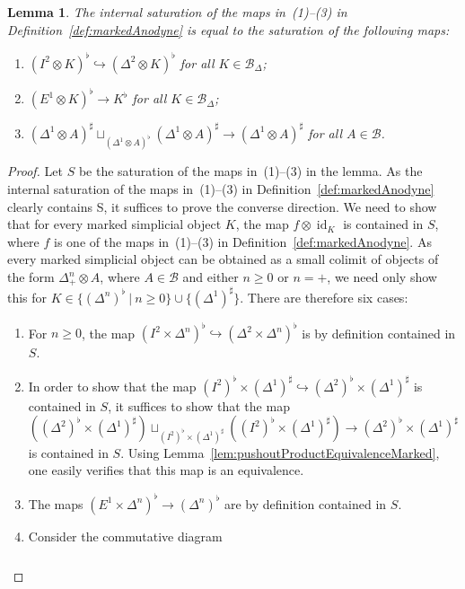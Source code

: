 \documentclass[reqno]{amsart}
\numberwithin{equation}{subsection}
\theoremstyle{plain}
\newtheorem{lemma}[equation]{Lemma}
\theoremstyle{definition}
\let\scr=\mathcal
\let\into=\hookrightarrow
\def\BB{\scr B}
\DeclareMathOperator{\id}{id}
\newcommand{\Simp}[1]{#1_{\Delta}}
\begin{document}
\begin{lemma}
	\label{lem:markedAnodyneGenerators1}
	The internal saturation of the maps in~(1)--(3) in Definition~\ref{def:markedAnodyne} is equal to the saturation of the following maps:
	\begin{enumerate}
	\item $(I^2\otimes K)^\flat\into(\Delta^2\otimes K)^\flat$ for all $K\in\Simp\BB$;
	\item $(E^1\otimes K)^\flat\to K^{\flat}$ for all $K\in\Simp\BB$;
	\item $(\Delta^1\otimes A)^\sharp\sqcup_{(\Delta^1\otimes A)^\flat}(\Delta^1\otimes A)^\sharp\to (\Delta^1\otimes A)^\sharp$ for all $A\in\BB$.
	\end{enumerate}
\end{lemma}
\begin{proof}
	 Let $S$ be the saturation of the maps in~(1)--(3) in the lemma. As the internal saturation of the maps in~(1)--(3) in Definition~\ref{def:markedAnodyne} clearly contains S, it suffices to prove the converse direction. We need to show that for every marked simplicial object $K$, the map $f\otimes\id_K$ is contained in $S$, where $f$ is one of the maps in~(1)--(3) in Definition~\ref{def:markedAnodyne}. As every marked simplicial object can be obtained as a small colimit of objects of the form $\Delta_+^n\otimes A$, where $A\in\BB$ and either $n\geq 0$ or $n=+$, we need only show this for $K\in\{(\Delta^n)^\flat~\vert~n\geq 0\}\cup\{(\Delta^1)^\sharp\}$. There are therefore six cases:
	 	\begin{enumerate}
	 	\item For $n\geq 0$, the map $(I^2\times \Delta^n)^\flat \into (\Delta^2\times \Delta^n)^\flat$ is by definition contained in $S$.
	 	\item In order to show that the map $(I^2)^\flat\times (\Delta^1)^\sharp\into (\Delta^2)^\flat\times(\Delta^1)^\sharp$ is contained in $S$, it suffices to show that the map $((\Delta^2)^\flat\times(\Delta^1)^\sharp)\sqcup_{(I^2)^\flat\times(\Delta^1)^\sharp}((I^2)^\flat\times (\Delta^1)^\sharp)\to (\Delta^2)^\flat\times(\Delta^1)^\sharp$ is contained in $S$. Using Lemma~\ref{lem:pushoutProductEquivalenceMarked}, one easily verifies that this map is an equivalence.
	 	\item The maps $(E^1\times \Delta^n)^\flat \to (\Delta^n)^\flat$ are by definition contained in $S$.
	 	\item Consider the commutative diagram
	 	\begin{equation*}
	 	\begin{tikzcd}[column sep={6.5em,between origins}, row sep={3em,between origins}]

\end{tikzcd}
\end{equation*}
\end{enumerate}
\end{proof}
\end{document}
